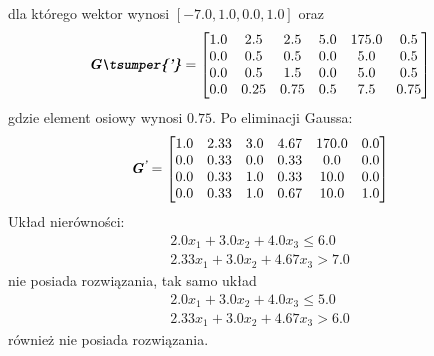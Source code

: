 dla którego wektor  wynosi $[-7.0,1.0,0.0,1.0]$ oraz
\begin{equation*}
  \mf{G\tsumper{'}} =
  \begin{bmatrix}
    1.0 & 2.5 & 2.5 & 5.0 & 175.0 & 0.5 \\
    0.0 & 0.5 & 0.5 & 0.0 & 5.0 & 0.5 \\
    0.0 & 0.5 & 1.5 & 0.0 & 5.0 & 0.5 \\
    0.0 & 0.25 & 0.75 & 0.5 & 7.5 & 0.75
  \end{bmatrix}
\end{equation*}
gdzie element osiowy wynosi $0.75$. Po eliminacji Gaussa:
\begin{equation*}
  \textbf{\textit{G\textsuperscript{'}}} =
  \begin{bmatrix}
    1.0 & 2.33 & 3.0 & 4.67 & 170.0 & 0.0 \\
    0.0 & 0.33 & 0.0 & 0.33 & 0.0 & 0.0 \\
    0.0 & 0.33 & 1.0 & 0.33 & 10.0 & 0.0 \\
    0.0 & 0.33 & 1.0 & 0.67 & 10.0 & 1.0
  \end{bmatrix}
\end{equation*}
Układ nierówności:
\begin{equation*}
  \begin{aligned}
    2.0 x_{1}+ 3.0 x_{2}+ 4.0 x_{3} \le 6.0 \\
    2.33 x_{1}+ 3.0 x_{2}+ 4.67 x_{3} > 7.0
  \end{aligned}
\end{equation*}
nie posiada rozwiązania, tak samo układ
\begin{equation*}
  \begin{aligned}
    2.0 x_{1}+ 3.0 x_{2}+ 4.0 x_{3} \le 5.0 \\
    2.33 x_{1}+ 3.0 x_{2}+ 4.67 x_{3} > 6.0
  \end{aligned}
\end{equation*}
również nie posiada rozwiązania.

